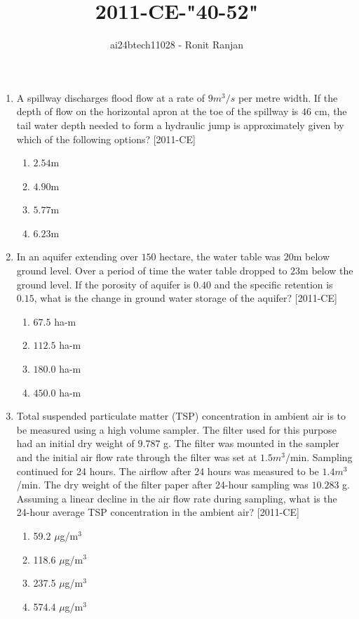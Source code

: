 \documentclass[journal,12pt,onecolumn]{IEEEtran}
\theoremstyle{remark}
\begin{document}

\vspace{3cm}

\title{2011-CE-"40-52"}
\author{ai24btech11028 - Ronit Ranjan}
\maketitle
\bigskip


\begin{enumerate}


    \item A spillway discharges flood flow at a rate of $9 m^3/s$ per metre width. If the depth of flow on the horizontal apron at the toe of the spillway is $46$ cm, the tail water depth needed to form a hydraulic jump is approximately given by which of the following options? \hfill{[2011-CE]}
    \begin{enumerate}
        \item $2.54$m
        \item $4.90$m
        \item $5.77$m
        \item $6.23$m
    \end{enumerate}

    \item In an aquifer extending over $150$ hectare, the water table was $20$m below ground level. Over a period of time the water table dropped to $23$m below the ground level. If the porosity of aquifer is $0.40$ and the specific retention is $0.15$, what is the change in ground water storage of the aquifer? \hfill{[2011-CE]}
    \begin{enumerate}
        \item $67.5$ ha-m
        \item $112.5$ ha-m
        \item $180.0$ ha-m
        \item $450.0$ ha-m
    \end{enumerate}

    \item Total suspended particulate matter (TSP) concentration in ambient air is to be measured using a high volume sampler. The filter used for this purpose had an initial dry weight of $9.787$ g. The filter was mounted in the sampler and the initial air flow rate through the filter was set at $1.5 m^3$/min. Sampling continued for 24 hours. The airflow after 24 hours was measured to be $1.4 m^3$/min. The dry weight of the filter paper after 24-hour sampling was $10.283$ g. Assuming a linear decline in the air flow rate during sampling, what is the 24-hour average TSP concentration in the ambient air? \hfill{[2011-CE]}
    \begin{enumerate}
        \item 59.2 $\mu$g/m$^3$
        \item 118.6 $\mu$g/m$^3$
        \item 237.5 $\mu$g/m$^3$
        \item 574.4 $\mu$g/m$^3$
    \end{enumerate}


\end{enumerate}
\end{document}
